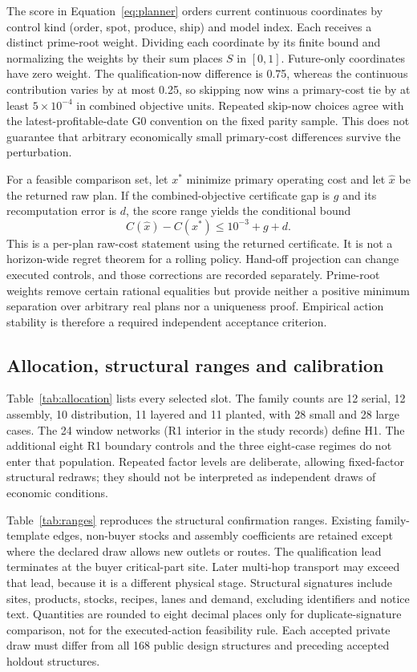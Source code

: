 \documentclass[preprint,11pt,authoryear]{elsarticle}
\begin{document}
The score in Equation~\eqref{eq:planner} orders current continuous coordinates by control kind (order, spot, produce, ship) and model index. Each receives a distinct prime-root weight. Dividing each coordinate by its finite bound and normalizing the weights by their sum places $S$ in $[0,1]$. Future-only coordinates have zero weight. The qualification-now difference is 0.75, whereas the continuous contribution varies by at most 0.25, so skipping now wins a primary-cost tie by at least $5\times10^{-4}$ in combined objective units. Repeated skip-now choices agree with the latest-profitable-date G0 convention on the fixed parity sample. This does not guarantee that arbitrary economically small primary-cost differences survive the perturbation.

For a feasible comparison set, let $x^*$ minimize primary operating cost and let $\hat x$ be the returned raw plan. If the combined-objective certificate gap is $g$ and its recomputation error is $d$, the score range yields the conditional bound
\[
 C(\hat x)-C(x^*)\le10^{-3}+g+d.
\]
This is a per-plan raw-cost statement using the returned certificate. It is not a horizon-wide regret theorem for a rolling policy. Hand-off projection can change executed controls, and those corrections are recorded separately. Prime-root weights remove certain rational equalities but provide neither a positive minimum separation over arbitrary real plans nor a uniqueness proof. Empirical action stability is therefore a required independent acceptance criterion.

\subsection{Allocation, structural ranges and calibration}
Table~\ref{tab:allocation} lists every selected slot. The family counts are 12 serial, 12 assembly, 10 distribution, 11 layered and 11 planted, with 28 small and 28 large cases. The 24 window networks (R1 interior in the study records) define H1. The additional eight R1 boundary controls and the three eight-case regimes do not enter that population. Repeated factor levels are deliberate, allowing fixed-factor structural redraws; they should not be interpreted as independent draws of economic conditions.

Table~\ref{tab:ranges} reproduces the structural confirmation ranges. Existing family-template edges, non-buyer stocks and assembly coefficients are retained except where the declared draw allows new outlets or routes. The qualification lead terminates at the buyer critical-part site. Later multi-hop transport may exceed that lead, because it is a different physical stage. Structural signatures include sites, products, stocks, recipes, lanes and demand, excluding identifiers and notice text. Quantities are rounded to eight decimal places only for duplicate-signature comparison, not for the executed-action feasibility rule. Each accepted private draw must differ from all 168 public design structures and preceding accepted holdout structures.
\end{document}
